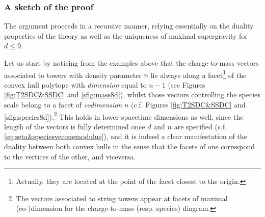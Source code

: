 \subsubsection{A sketch of the proof}
\label{sss:sketch}
	
The argument proceeds in a recursive manner, relying essentially on the duality properties of the theory as well as the uniqueness of maximal supergravity for $d\leq9$. 
	
Let us start by noticing from the examples above that the charge-to-mass vectors associated to towers with density parameter $n$ lie always along a facet\footnote{Actually, they are located at the point of the facet closest to the origin.} of the convex hull polytope with \emph{dimension} equal to $n-1$ (see Figures \ref{fig:T2SDC&SSDC} and \ref{sfig:mass8d}), whilst those vectors controlling the species scale belong to a facet of \emph{codimension} $n$ (c.f. Figures \ref{fig:T2SDC&SSDC} and \ref{sfig:species8d}).\footnote{The vectors associated to string towers appear at facets of maximal (co-)dimension for the charge-to-mass (resp. species) diagram.} This holds in lower spacetime dimensions as well, since the length of the vectors is fully determined once $d$ and $n$ are specified (c.f. \eqref{eq:zeta&speciesveconemodulus}), and it is indeed a  clear manifestation of the duality between both convex hulls in the sense that the facets of one correspond to the vertices of the other, and viceversa. 
	
